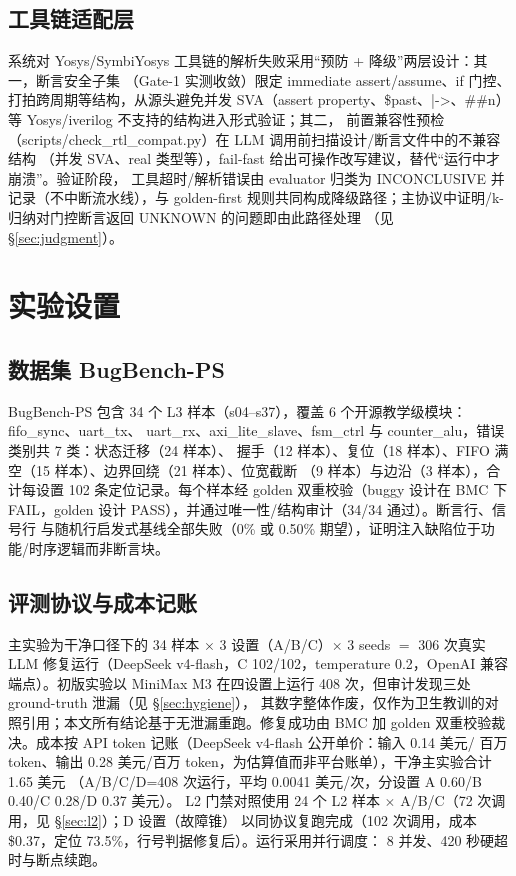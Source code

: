 \documentclass[twocolumn,10pt]{ctexart}
\begin{document}
\subsection{工具链适配层}\label{sec:toolchain}

系统对 Yosys/SymbiYosys 工具链的解析失败采用“预防 + 降级”两层设计：其一，断言安全子集
（Gate-1 实测收敛）限定 immediate assert/assume、if 门控、打拍跨周期等结构，从源头避免并发
SVA（assert property、\$past、|->、\#\#n）等 Yosys/iverilog 不支持的结构进入形式验证；其二，
前置兼容性预检（scripts/check\_rtl\_compat.py）在 LLM 调用前扫描设计/断言文件中的不兼容结构
（并发 SVA、real 类型等），fail-fast 给出可操作改写建议，替代“运行中才崩溃”。验证阶段，
工具超时/解析错误由 evaluator 归类为 INCONCLUSIVE 并记录（不中断流水线），与 golden-first
规则共同构成降级路径；主协议中证明/k-归纳对门控断言返回 UNKNOWN 的问题即由此路径处理
（见 \S\ref{sec:judgment}）。

\section{实验设置}\label{sec:setup}

\subsection{数据集 BugBench-PS}

BugBench-PS 包含 34 个 L3 样本（s04--s37），覆盖 6 个开源教学级模块：fifo\_sync、uart\_tx、
uart\_rx、axi\_lite\_slave、fsm\_ctrl 与 counter\_alu，错误类别共 7 类：状态迁移（24 样本）、
握手（12 样本）、复位（18 样本）、FIFO 满空（15 样本）、边界回绕（21 样本）、位宽截断
（9 样本）与边沿（3 样本），合计每设置 102 条定位记录。每个样本经 golden 双重校验（buggy
设计在 BMC 下 FAIL，golden 设计 PASS），并通过唯一性/结构审计（34/34 通过）。断言行、信号行
与随机行启发式基线全部失败（0\% 或 0.50\% 期望），证明注入缺陷位于功能/时序逻辑而非断言块。

\subsection{评测协议与成本记账}

主实验为干净口径下的 34 样本 $\times$ 3 设置（A/B/C）$\times$ 3 seeds $=$ 306 次真实 LLM
修复运行（DeepSeek v4-flash，C 102/102，temperature 0.2，OpenAI 兼容端点）。初版实验以
MiniMax M3 在四设置上运行 408 次，但审计发现三处 ground-truth 泄漏（见 \S\ref{sec:hygiene}），
其数字整体作废，仅作为卫生教训的对照引用；本文所有结论基于无泄漏重跑。修复成功由 BMC 加
golden 双重校验裁决。成本按 API token 记账（DeepSeek v4-flash 公开单价：输入 0.14 美元/
百万 token、输出 0.28 美元/百万 token，为估算值而非平台账单），干净主实验合计 1.65 美元
（A/B/C/D=408 次运行，平均 0.0041 美元/次，分设置 A 0.60/B 0.40/C 0.28/D 0.37 美元）。
L2 门禁对照使用 24 个 L2 样本 $\times$ A/B/C（72 次调用，见 \S\ref{sec:l2}）；D 设置（故障锥）
以同协议复跑完成（102 次调用，成本 \$0.37，定位 73.5\%，行号判据修复后）。运行采用并行调度：
8 并发、420 秒硬超时与断点续跑。
\end{document}
